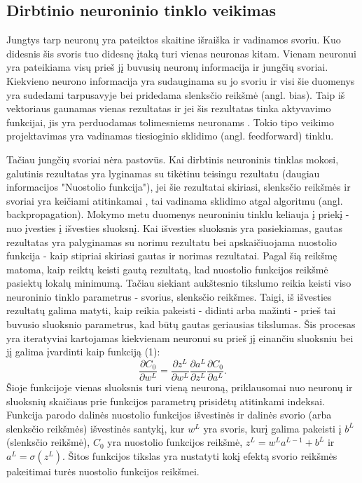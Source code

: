 \documentclass{VUMIFPSkursinis}
\begin{document}
\subsection{Dirbtinio neuroninio tinklo veikimas}
Jungtys tarp neuronų yra pateiktos skaitine išraiška ir vadinamos svoriu. Kuo didesnis šis svoris tuo didesnę įtaką turi vienas neuronas kitam.
Vienam neuronui yra pateikiama visų prieš jį buvusių neuronų informacija ir jungčių svoriai. Kiekvieno neurono informacija yra sudauginama su
jo svoriu ir visi šie duomenys yra sudedami tarpusavyje bei pridedama slenksčio reikšmė (angl. bias). Taip iš vektoriaus gaunamas vienas rezultatas ir jei šis rezultatas tinka aktyvavimo
funkcijai, jis yra perduodamas tolimesniems neuronams \cite{shiffman2012nature}. Tokio tipo veikimo projektavimas yra vadinamas tiesioginio sklidimo (angl. feedforward) tinklu.

Tačiau jungčių svoriai nėra pastovūs. Kai dirbtinis neuroninis tinklas mokosi, galutinis rezultatas yra lyginamas su tikėtinu teisingu rezultatu (daugiau informacijos "Nuostolio funkcija"), jei šie
rezultatai skiriasi, slenksčio reikšmės ir svoriai yra keičiami atitinkamai \cite{backpropogation}, tai vadinama sklidimo atgal algoritmu (angl. backpropagation).
Mokymo metu duomenys neuroniniu tinklu keliauja į priekį - nuo įvesties į išvesties sluoksnį. Kai išvesties sluoksnis yra pasiekiamas, gautas rezultatas yra palyginamas su norimu rezultatu bei 
apskaičiuojama nuostolio funkcija - kaip stipriai skiriasi gautas ir norimas rezultatai. Pagal šią reikšmę matoma, kaip reiktų keisti gautą rezultatą, kad nuostolio funkcijos reikšmė pasiektų lokalų 
minimumą. Tačiau siekiant aukštesnio tikslumo reikia keisti viso neuroninio tinklo parametrus - svorius, slenksčio reikšmes. Taigi, iš išvesties rezultatų galima matyti, kaip reikia pakeisti - 
didinti arba mažinti - prieš tai buvusio sluoksnio parametrus, kad būtų gautas geriausias tikslumas. Šis procesas yra iteratyviai kartojamas kiekvienam neuronui su prieš jį einančiu sluoksniu bei jį galima įvardinti kaip funkciją (1):
\begin{equation}
\frac{\partial{C_{0}}}{\partial{w^{L}}} = \frac{\partial{z^{L}}}{\partial{w^{L}}} \frac{\partial{a^{L}}}{\partial{z^{L}}} \frac{\partial{C_{0}}}{\partial{a^{L}}}.
\end{equation}
Šioje funkcijoje vienas sluoksnis turi vieną neuroną, priklausomai nuo neuronų ir sluoksnių skaičiaus prie funkcijos parametrų prisidėtų atitinkami indeksai. Funkcija parodo dalinės nuostolio funkcijos 
išvestinės ir dalinės svorio (arba slenksčio reikšmės) išvestinės santykį, kur \(w^{L}\) yra svoris, kurį galima pakeisti į \(b^{L}\) (slenksčio reikšmė), \(C_{0}\) yra nuostolio funkcijos reikšmė, 
\(z^{L} = w^{L}a^{L-1}+b^{L}\) ir \(a^{L}=\sigma(z^{L})\). Šitos funkcijos tikslas yra nustatyti kokį efektą svorio reikšmės pakeitimai turės nuostolio funkcijos reikšmei.
\end{document}
